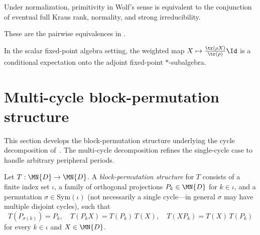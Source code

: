 \begin{theorem}%
    \label{thm:wolf_6_8_conjunction}
    \leanok
    Under normalization, primitivity in Wolf's sense is equivalent to the conjunction
    of eventual full Kraus rank, normality, and strong irreducibility.
\end{theorem}

\begin{remark}
    \label{rem:wolf_6_8_pairwise}
    \leanok
    These are the pairwise equivalences in
    \cite[Theorem~6.8]{Wolf2012Quantum}.
\end{remark}

\begin{theorem}
    \label{thm:wolf_6_15_scalar_conditional_expectation}
    \leanok
    In the scalar fixed-point algebra setting, the weighted map
    $X \mapsto \frac{\tr(\rho X)}{\tr(\rho)}\Id$ is a conditional
    expectation onto the adjoint fixed-point $*$-subalgebra.
\end{theorem}

\section{Multi-cycle block-permutation structure}

This section develops the block-permutation structure underlying the
cycle decomposition of~\cite[Theorem~6.16]{Wolf2012Quantum}. The
multi-cycle decomposition refines the single-cycle case to handle
arbitrary peripheral periods.

\begin{definition}
    \label{def:cycle_structure}
    \leanok
    Let $T : \MN{D} \to \MN{D}$. A \emph{block-permutation structure} for
    $T$ consists of a finite index set $\iota$, a family of orthogonal
    projections $P_k \in \MN{D}$ for $k \in \iota$, and a permutation
    $\sigma \in \mathrm{Sym}(\iota)$ (not necessarily a single cycle---in
    general $\sigma$ may have multiple disjoint cycles), such that
    \[
        T(P_{\sigma(k)}) = P_k,\quad
        T(P_k X) = T(P_k)\,T(X),\quad
        T(X P_k) = T(X)\,T(P_k)
    \]
    for every $k \in \iota$ and $X \in \MN{D}$.
\end{definition}

